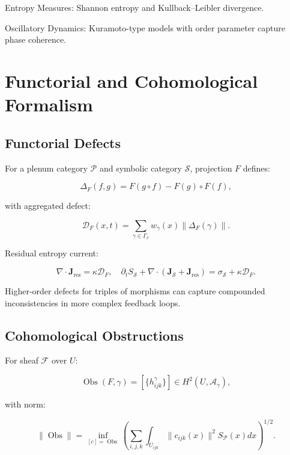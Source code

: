 \documentclass[12pt]{article}
\theoremstyle{plain}
\begin{document}
Entropy Measures: Shannon entropy and Kullback–Leibler divergence.

Oscillatory Dynamics: Kuramoto-type models with order parameter capture phase coherence.

\section{Functorial and Cohomological Formalism}

\subsection{Functorial Defects}

For a plenum category \(\mathcal{P}\) and symbolic category \(\mathcal{S}\), projection \(F\) defines:

\begin{equation}
\Delta_F(f,g) = F(g \circ f) - F(g) \circ F(f),
\end{equation}

with aggregated defect:

\begin{equation}
\mathcal{D}_F(x,t) = \sum_{\gamma \in \Gamma_x} w_\gamma(x) \|\Delta_F(\gamma)\|.
\end{equation}

Residual entropy current:

\begin{equation}
\nabla \cdot \mathbf{J}_{\mathrm{res}} = \kappa \mathcal{D}_F, \quad \partial_t S_\mathcal{S} + \nabla \cdot (\mathbf{J}_\mathcal{S} + \mathbf{J}_{\mathrm{res}}) = \sigma_\mathcal{S} + \kappa \mathcal{D}_F.
\end{equation}

Higher-order defects for triples of morphisms can capture compounded inconsistencies in more complex feedback loops.

\subsection{Cohomological Obstructions}

For sheaf \(\mathcal{F}\) over \(U\):

\begin{equation}
\operatorname{Obs}(F,\gamma) = [\{h_{ijk}^\gamma\}] \in H^2(U, \mathcal{A}_\gamma),
\end{equation}

with norm:

\begin{equation}
\|\operatorname{Obs}\| = \inf_{[c]=\operatorname{Obs}} \left( \sum_{i,j,k} \int_{U_{ijk}} \|c_{ijk}(x)\|^2 S_\mathcal{P}(x) dx \right)^{1/2}.
\end{equation}
\end{document}
